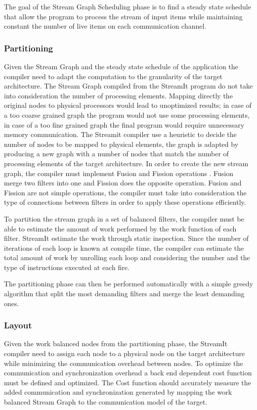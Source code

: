 \documentclass[../main.tex]{subfiles}
\begin{document}
The goal of the Stream Graph Scheduling phase is to find a steady state schedule that allow the program to process the stream of input items while maintaining constant the number of live items on each communication channel.

\subsubsection{Partitioning}
Given the Stream Graph and the steady state schedule of the application the compiler need to adapt the computation to the granularity of the target architecture. 
The Stream Graph compiled from the StreamIt program do not take into consideration the number of processing elements. Mapping directly the original nodes to physical processors would lead to unoptimized results; in case of a too coarse grained graph the program would not use some processing elements, in case of a too fine grained graph the final program would require unnecessary memory communication.
The Streamit compiler use a heuristic to decide the number of nodes to be mapped to physical elements, the graph is adapted by producing a new graph with a number of nodes that match the number of processing elements of the target architecture.
In order to create the new stream graph, the compiler must implement Fusion and Fission operations \cite{streamit2}. Fusion merge two filters into one and Fission does the opposite operation. Fusion and Fission are not simple operations, the compiler must take into consideration the type of connections between filters in order to apply these operations efficiently.

To partition the stream graph in a set of balanced filters, the compiler must be able to estimate the amount of work performed by the work function of each filter. StreamIt estimate the work through static inspection. Since the number of iterations of each loop is known at compile time, the compiler can estimate the total amount of work by unrolling each loop and considering the number and the type of instructions executed at each fire. 

The partitioning phase can then be performed automatically with a simple greedy algorithm that split the most demanding filters and merge the least demanding ones.

\subsubsection{Layout}
Given the work balanced nodes from the partitioning phase, the StreamIt compiler need to assign each node to a physical node on the target architecture while minimizing the communication overhead between nodes.
To optimize the communication and synchronization overhead a back end dependent cost function must be defined and optimized. The Cost function should accurately measure the added communication and synchronization generated by mapping the work balanced Stream Graph to the communication model of the target. 
\end{document}
